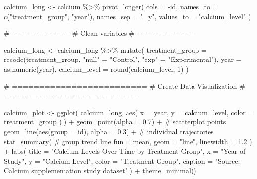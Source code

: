 \documentclass[
  letterpaper,
  DIV=11,
  numbers=noendperiod]{scrartcl}
\newenvironment{Shaded}{\begin{snugshade}}{\end{snugshade}}
\newcommand{\AttributeTok}[1]{\textcolor[rgb]{0.40,0.45,0.13}{#1}}
\newcommand{\CommentTok}[1]{\textcolor[rgb]{0.37,0.37,0.37}{#1}}
\newcommand{\DecValTok}[1]{\textcolor[rgb]{0.68,0.00,0.00}{#1}}
\newcommand{\FloatTok}[1]{\textcolor[rgb]{0.68,0.00,0.00}{#1}}
\newcommand{\FunctionTok}[1]{\textcolor[rgb]{0.28,0.35,0.67}{#1}}
\newcommand{\NormalTok}[1]{\textcolor[rgb]{0.00,0.23,0.31}{#1}}
\newcommand{\OtherTok}[1]{\textcolor[rgb]{0.00,0.23,0.31}{#1}}
\newcommand{\SpecialCharTok}[1]{\textcolor[rgb]{0.37,0.37,0.37}{#1}}
\newcommand{\StringTok}[1]{\textcolor[rgb]{0.13,0.47,0.30}{#1}}
\begin{document}
\begin{Shaded}
\begin{Highlighting}[]
\NormalTok{calcium\_long }\OtherTok{\textless{}{-}}\NormalTok{ calcium }\SpecialCharTok{\%\textgreater{}\%}
  \FunctionTok{pivot\_longer}\NormalTok{(}
    \AttributeTok{cols =} \SpecialCharTok{{-}}\NormalTok{id,}
    \AttributeTok{names\_to =} \FunctionTok{c}\NormalTok{(}\StringTok{"treatment\_group"}\NormalTok{, }\StringTok{"year"}\NormalTok{),}
    \AttributeTok{names\_sep =} \StringTok{"\_y"}\NormalTok{,}
    \AttributeTok{values\_to =} \StringTok{"calcium\_level"}
\NormalTok{  )}

\CommentTok{\# {-}{-}{-}{-}{-}{-}{-}{-}{-}{-}{-}{-}{-}{-}{-}{-}{-}{-}{-}{-}{-}{-}{-}{-}{-}}
\CommentTok{\# Clean variables}
\CommentTok{\# {-}{-}{-}{-}{-}{-}{-}{-}{-}{-}{-}{-}{-}{-}{-}{-}{-}{-}{-}{-}{-}{-}{-}{-}{-}}

\NormalTok{calcium\_long }\OtherTok{\textless{}{-}}\NormalTok{ calcium\_long }\SpecialCharTok{\%\textgreater{}\%}
  \FunctionTok{mutate}\NormalTok{(}
    \AttributeTok{treatment\_group =} \FunctionTok{recode}\NormalTok{(treatment\_group,}
                             \StringTok{"null"} \OtherTok{=} \StringTok{"Control"}\NormalTok{,}
                             \StringTok{"exp"}  \OtherTok{=} \StringTok{"Experimental"}\NormalTok{),}
    \AttributeTok{year =} \FunctionTok{as.numeric}\NormalTok{(year),}
    \AttributeTok{calcium\_level =} \FunctionTok{round}\NormalTok{(calcium\_level, }\DecValTok{1}\NormalTok{)}
\NormalTok{  )}

\CommentTok{\# =========================}
\CommentTok{\# Create Data Visualization}
\CommentTok{\# =========================}

\NormalTok{calcium\_plot }\OtherTok{\textless{}{-}} \FunctionTok{ggplot}\NormalTok{(}
\NormalTok{  calcium\_long,}
  \FunctionTok{aes}\NormalTok{(}
    \AttributeTok{x =}\NormalTok{ year,}
    \AttributeTok{y =}\NormalTok{ calcium\_level,}
    \AttributeTok{color =}\NormalTok{ treatment\_group}
\NormalTok{  )}
\NormalTok{) }\SpecialCharTok{+}
  \FunctionTok{geom\_point}\NormalTok{(}\AttributeTok{alpha =} \FloatTok{0.7}\NormalTok{) }\SpecialCharTok{+}                 \CommentTok{\# scatterplot points}
  \FunctionTok{geom\_line}\NormalTok{(}\FunctionTok{aes}\NormalTok{(}\AttributeTok{group =}\NormalTok{ id), }\AttributeTok{alpha =} \FloatTok{0.3}\NormalTok{) }\SpecialCharTok{+} \CommentTok{\# individual trajectories}
  \FunctionTok{stat\_summary}\NormalTok{(                             }\CommentTok{\# group trend line}
    \AttributeTok{fun =}\NormalTok{ mean,}
    \AttributeTok{geom =} \StringTok{"line"}\NormalTok{,}
    \AttributeTok{linewidth =} \FloatTok{1.2}
\NormalTok{  ) }\SpecialCharTok{+}
  \FunctionTok{labs}\NormalTok{(}
    \AttributeTok{title =} \StringTok{"Calcium Levels Over Time by Treatment Group"}\NormalTok{,}
    \AttributeTok{x =} \StringTok{"Year of Study"}\NormalTok{,}
    \AttributeTok{y =} \StringTok{"Calcium Level"}\NormalTok{,}
    \AttributeTok{color =} \StringTok{"Treatment Group"}\NormalTok{,}
    \AttributeTok{caption =} \StringTok{"Source: Calcium supplementation study dataset"}
\NormalTok{  ) }\SpecialCharTok{+}
  \FunctionTok{theme\_minimal}\NormalTok{()}


\end{Highlighting}
\end{Shaded}
\end{document}
